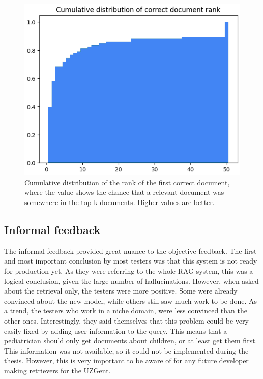 \begin{figure}[H]
    \captionsetup{justification=centering}
    \centerline{\includegraphics[width=0.7\linewidth]{fig/rag_cumulative_doc_rank.png}}
    \caption{Cumulative distribution of the rank of the first correct document, where the value shows the chance that a relevant document was somewhere in the top-k documents. Higher values are better.}
    \label{fig:chunk_rank_cumulative_distribution}
\end{figure}

\subsection{Informal feedback}
The informal feedback provided great nuance to the objective feedback. The first and most important conclusion by most testers was that this system is not ready for production yet. As they were referring to the whole RAG system, this was a logical conclusion, given the large number of hallucinations. However, when asked about the retrieval only, the testers were more positive. Some were already convinced about the new model, while others still saw much work to be done. As a trend, the testers who work in a niche domain, were less convinced than the other ones. Interestingly, they said themselves that this problem could be very easily fixed by adding user information to the query. This means that a pediatrician should only get documents about children, or at least get them first. This information was not available, so it could not be implemented during the thesis. However, this is very important to be aware of for any future developer making retrievers for the UZGent.

